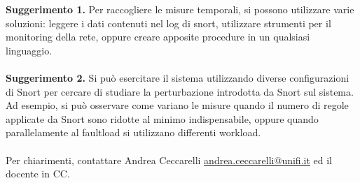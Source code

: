 \textbf{Suggerimento 1.} Per raccogliere le misure temporali, si possono utilizzare varie soluzioni: leggere i dati contenuti nel log di snort, utilizzare strumenti per il monitoring della rete, oppure creare apposite procedure in un qualsiasi linguaggio.\\
\\
\textbf{Suggerimento 2.} Si può esercitare il sistema utilizzando diverse configurazioni di Snort per cercare di studiare la perturbazione introdotta da Snort sul sistema. Ad esempio, si può osservare come variano le misure quando il numero di regole applicate da Snort sono ridotte al minimo indispensabile, oppure quando parallelamente al faultload si utilizzano differenti workload.\\
\\
Per chiarimenti, contattare Andrea Ceccarelli \url{andrea.ceccarelli@unifi.it} ed il docente in CC.